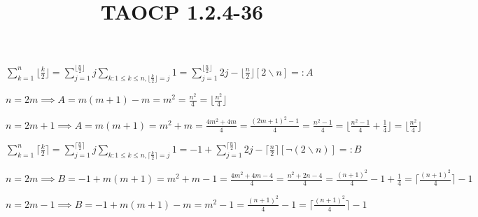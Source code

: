 \documentclass{article}
\title{TAOCP 1.2.4\mbox{-}36}
\begin{document}
\maketitle

\( \sum_{k=1}^{n} \lfloor \frac{k}{2} \rfloor = \sum_{j=1}^{\lfloor\frac{n}{2}\rfloor} j \sum_{k:1 \leq k \leq n, \lfloor \frac{k}{2} \rfloor = j} 1 = \sum_{j=1}^{\lfloor\frac{n}{2}\rfloor} 2j - \lfloor\frac{n}{2} \rfloor [2 \backslash n] =: A \)

\( n = 2m \implies A = m(m+1) - m = m^{2} = \frac{n^{2}}{4} = \lfloor \frac{n^{2}}{4} \rfloor \)

\( n = 2m + 1 \implies A = m(m+1) = m^{2} + m = \frac{4m^{2}+4m}{4} = \frac{{(2m+1)}^{2}-1}{4} = \frac{n^{2}-1}{4} = \lfloor \frac{n^{2}-1}{4} + \frac{1}{4} \rfloor =  \lfloor \frac{n^{2}}{4} \rfloor \)

\( \sum_{k=1}^{n} \lceil \frac{k}{2} \rceil = \sum_{j=1}^{\lceil\frac{n}{2}\rceil} j \sum_{k:1 \leq k \leq n, \lceil \frac{k}{2} \rceil = j} 1 = -1 + \sum_{j=1}^{\lceil\frac{n}{2}\rceil} 2j - \lceil\frac{n}{2} \rceil [\lnot(2 \backslash n)] =: B \)

\( n = 2m \implies B = -1 + m(m+1) = m^{2}+m-1 = \frac{4m^{2}+4m-4}{4} = \frac{n^{2}+2n-4}{4} = \frac{{(n+1)}^{2}}{4} - 1 + \frac{1}{4} = \lceil \frac{{(n+1)}^{2}}{4} \rceil - 1 \)

\( n = 2m-1 \implies B = -1 + m(m+1) - m = m^{2} - 1 = \frac{{(n+1)}^{2}}{4} - 1 = \lceil \frac{{(n+1)}^{2}}{4} \rceil - 1 \)
\end{document}
